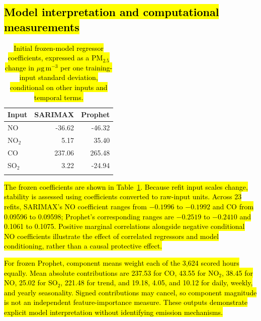 \documentclass[pdflatex,sn-basic,Numbered]{sn-jnl}
\newcommand{\rev}[1]{\hl{#1}}
\newcommand{\PMunit}{\ensuremath{\mu\mathrm{g}\,\mathrm{m}^{-3}}}
\begin{document}
\subsection{\texorpdfstring{\rev{Model interpretation and computational measurements}}{Model interpretation and computational measurements}}

\begin{table}[htbp]
\caption{\rev{Initial frozen-model regressor coefficients, expressed as a PM$_{2.5}$ change in \PMunit{} per one training-input standard deviation, conditional on other inputs and temporal terms.}}
\label{tab:effects}
\begingroup\small\setlength{\tabcolsep}{4pt}
\begin{tabularx}{\linewidth}{@{}Xrr@{}}
\toprule
Input & SARIMAX & Prophet \\
\midrule
NO & -36.62 & -46.32 \\
NO$_2$ & 5.17 & 35.40 \\
CO & 237.06 & 265.48 \\
SO$_2$ & 3.22 & -24.94 \\
\botrule
\end{tabularx}\endgroup
\end{table}

\rev{The frozen coefficients are shown in Table~\ref{tab:effects}. Because refit input scales change, stability is assessed using coefficients converted to raw-input units. Across 23 refits, SARIMAX's NO coefficient ranges from $-0.1996$ to $-0.1992$ and CO from 0.09596 to 0.09598; Prophet's corresponding ranges are $-0.2519$ to $-0.2410$ and 0.1061 to 0.1075. Positive marginal correlations alongside negative conditional NO coefficients illustrate the effect of correlated regressors and model conditioning, rather than a causal protective effect.}

\rev{For frozen Prophet, component means weight each of the 3,624 scored hours equally. Mean absolute contributions are 237.53 for CO, 43.55 for NO$_2$, 38.45 for NO, 25.02 for SO$_2$, 221.48 for trend, and 19.18, 4.05, and 10.12 for daily, weekly, and yearly seasonality. Signed contributions may cancel, so component magnitude is not an independent feature-importance measure. These outputs demonstrate explicit model interpretation without identifying emission mechanisms.}
\end{document}
